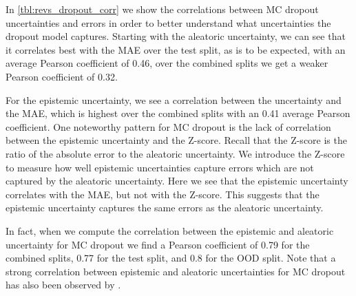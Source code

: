 In \cref{tbl:revs_dropout_corr} we show the correlations between MC dropout uncertainties and errors in order to better understand what uncertainties the dropout model captures. 
Starting with the aleatoric uncertainty, we can see that it correlates best with the MAE over the test split, as is to be expected, with an average Pearson coefficient of 0.46, over the combined splits we get a weaker Pearson coefficient of 0.32. 

For the epistemic uncertainty, we see a correlation between the uncertainty and the MAE, which is highest over the combined splits with an 0.41 average Pearson coefficient. One noteworthy pattern for MC dropout is the lack of correlation between the epistemic uncertainty and the Z-score. Recall that the Z-score is the ratio of the absolute error to the aleatoric uncertainty. We introduce the Z-score to measure how well epistemic uncertainties capture errors which are not captured by the aleatoric uncertainty. Here we see that the epistemic uncertainty correlates with the MAE, but not with the Z-score. This suggests that the epistemic uncertainty captures the same errors as the aleatoric uncertainty. 

In fact, when we compute the correlation between the epistemic and aleatoric uncertainty for MC dropout we find a Pearson coefficient of 0.79 for the combined splits, 0.77 for the test split, and 0.8 for the OOD split. Note that a strong correlation between epistemic and aleatoric uncertainties for MC dropout has also been observed by \cite{kendall2017uncertainties}.

